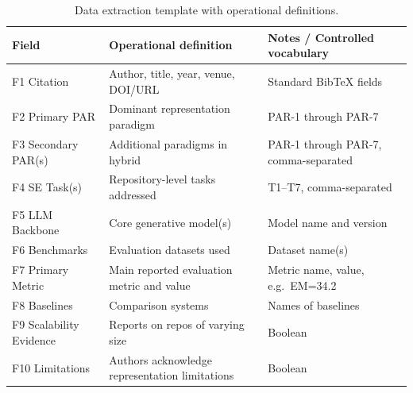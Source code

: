 \begin{table}[h]
\caption{Data extraction template with operational definitions.}
\label{tab:extraction-template}
\small
\begin{tabular}{lp{4cm}p{5cm}}
\toprule
\textbf{Field} & \textbf{Operational definition} & \textbf{Notes / Controlled vocabulary} \\
\midrule
F1 Citation & Author, title, year, venue, DOI/URL & Standard BibTeX fields \\
F2 Primary PAR & Dominant representation paradigm & PAR-1 through PAR-7 \\
F3 Secondary PAR(s) & Additional paradigms in hybrid & PAR-1 through PAR-7, comma-separated \\
F4 SE Task(s) & Repository-level tasks addressed & T1--T7, comma-separated \\
F5 LLM Backbone & Core generative model(s) & Model name and version \\
F6 Benchmarks & Evaluation datasets used & Dataset name(s) \\
F7 Primary Metric & Main reported evaluation metric and value & Metric name, value, e.g.\ EM=34.2 \\
F8 Baselines & Comparison systems & Names of baselines \\
F9 Scalability Evidence & Reports on repos of varying size & Boolean \\
F10 Limitations & Authors acknowledge representation limitations & Boolean \\
\bottomrule
\end{tabular}
\end{table}
